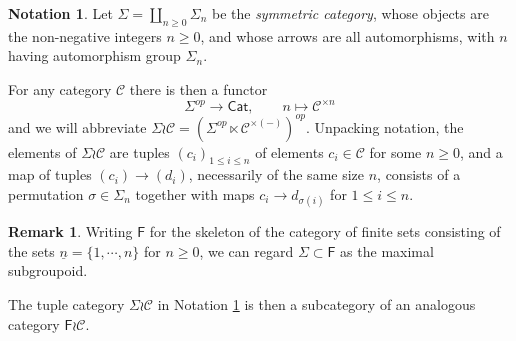 \documentclass[a4paper,10pt
]{article}%
\numberwithin{equation}{section}
\numberwithin{figure}{section}
\theoremstyle{definition} %
\newtheorem{remark}[equation]{Remark}%
\newtheorem{notation}[equation]{Notation}%
\newcommand{\longto}{\longrightarrow}%
\newcommand{\Cat}{\mathsf{Cat}}
\newcommand{\C}{\ensuremath{\mathcal C}}
\newcommand{\1}{\ensuremath{\mathbbm 1}}%
\begin{document}
\begin{notation}\label{SIGWR NOT}
	Let $\Sigma = \coprod_{n \geq 0} \Sigma_n$
	be the \emph{symmetric category},
	whose objects are the non-negative integers $n\geq 0$,
	and whose arrows are all automorphisms,
	with $n$ having automorphism group $\Sigma_n$.
	
	For any category $\mathcal{C}$ there is then a functor
	\begin{equation}
	\Sigma^{op} \longto \Cat,
	\qquad
	n \mapsto \mathcal C^{\times n}
	\end{equation}
	and we will abbreviate
	$\Sigma \wr \C = 
	\left(\Sigma^{op} \ltimes \mathcal C^{\times (-)}\right)^{op}$.
	Unpacking notation, 
	the elements of $\Sigma \wr \mathcal{C}$
	are tuples
	$(c_i)_{1 \leq i \leq n}$
	of elements $c_i \in \mathcal{C}$ for some $n \geq 0$,
	and a map of tuples $(c_i) \to (d_i)$, 
	necessarily of the same size $n$,
	consists of a permutation 
	$\sigma \in \Sigma_n$
	together with maps
	$c_i \to d_{\sigma(i)}$
	for $1 \leq i \leq n$.
\end{notation}




\begin{remark}\label{FWR REM}
	Writing $\mathsf{F}$ for the skeleton of 
	the category of finite sets consisting of the sets 
	$\underline{n} = \{1,\cdots,n\}$ for $n \geq 0$,
	we can regard
	$\Sigma \subset \mathsf{F}$
	as the maximal subgroupoid.
	
	The tuple category $\Sigma \wr \mathcal{C}$
	in Notation \ref{SIGWR NOT}
	is then a subcategory of an analogous category
	$\mathsf{F} \wr \mathcal{C}$.
\end{remark}
\end{document}
